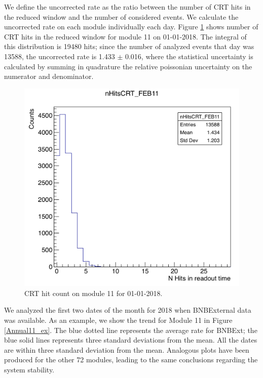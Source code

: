 We define the uncorrected rate as the ratio between the number of CRT hits in the reduced window and the number of considered events. We calculate the uncorrected rate on each module individually each day. 
Figure \ref{fig:count} shows number of CRT hits in the reduced window for module 11 on 01-01-2018. The integral of this distribution is 19480 hits; since the number of analyzed events that day was 13588, the uncorrected rate is 1.433 $\pm$ 0.016, where the statistical uncertainty is calculated by summing in quadrature the relative poissonian uncertainty on the numerator and denominator.

\begin{figure}[h!]
\centering
\includegraphics[scale=0.4]{images/count.png}
\caption{CRT hit count on module 11 for 01-01-2018.}
\label{fig:count}
\end{figure}



We analyzed the first two dates of the month for 2018 when BNBExternal data was available. 
As an example, we show the trend for Module 11 in Figure \ref{Annual11_ex}. The blue dotted line represents the average rate for BNBExt; the blue solid lines represents three standard deviations from the mean. All the dates are within three standard deviation from the mean. Analogous plots have been produced for the other 72 modules, leading to the same conclusions regarding the system stability.

